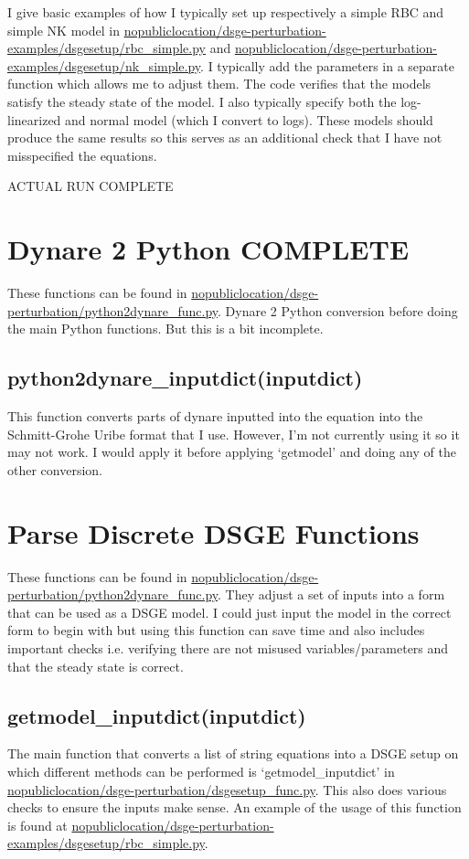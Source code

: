 \documentclass{article}
\theoremstyle{definition}
\begin{document}
I give basic examples of how I typically set up respectively a simple RBC and simple NK model in \url{nopubliclocation/dsge-perturbation-examples/dsgesetup/rbc_simple.py} and \url{nopubliclocation/dsge-perturbation-examples/dsgesetup/nk_simple.py}. I typically add the parameters in a separate function which allows me to adjust them. The code verifies that the models satisfy the steady state of the model. I also typically specify both the log-linearized and normal model (which I convert to logs). These models should produce the same results so this serves as an additional check that I have not misspecified the equations.

ACTUAL RUN COMPLETE

\section{Dynare 2 Python COMPLETE}
These functions can be found in \url{nopubliclocation/dsge-perturbation/python2dynare_func.py}. Dynare 2 Python conversion before doing the main Python functions. But this is a bit incomplete.

\subsection{python2dynare\_inputdict(inputdict)}

This function converts parts of dynare inputted into the equation into the Schmitt-Grohe Uribe format that I use. However, I'm not currently using it so it may not work. I would apply it before applying `getmodel' and doing any of the other conversion.
    
\section{Parse Discrete DSGE Functions}
These functions can be found in \url{nopubliclocation/dsge-perturbation/python2dynare_func.py}. They adjust a set of inputs into a form that can be used as a DSGE model. I could just input the model in the correct form to begin with but using this function can save time and also includes important checks i.e. verifying there are not misused variables/parameters and that the steady state is correct.

\subsection{getmodel\_inputdict(inputdict)}

The main function that converts a list of string equations into a DSGE setup on which different methods can be performed is `getmodel\_inputdict' in \url{nopubliclocation/dsge-perturbation/dsgesetup_func.py}. This also does various checks to ensure the inputs make sense. An example of the usage of this function is found at \url{nopubliclocation/dsge-perturbation-examples/dsgesetup/rbc_simple.py}.
\end{document}
